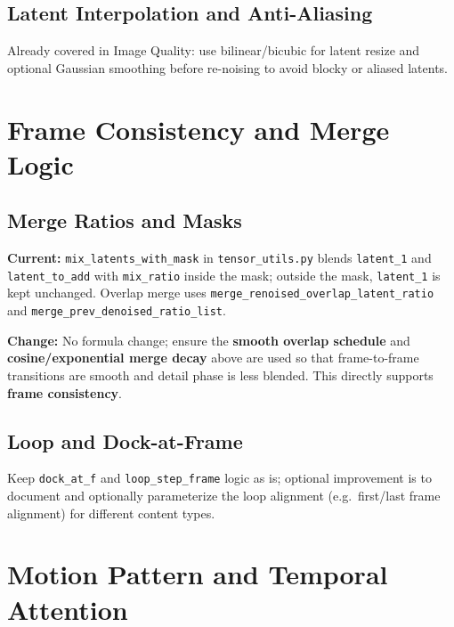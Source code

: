 \documentclass[11pt,a4paper]{article}
\newcommand{\file}[1]{\texttt{#1}}
\newcommand{\fn}[1]{\texttt{#1}}
\begin{document}
\subsection{Latent Interpolation and Anti-Aliasing}

Already covered in Image Quality: use bilinear/bicubic for latent resize and optional Gaussian smoothing before re-noising to avoid blocky or aliased latents.

\section{Frame Consistency and Merge Logic}

\subsection{Merge Ratios and Masks}

\textbf{Current:} \fn{mix\_latents\_with\_mask} in \file{tensor\_utils.py} blends \fn{latent\_1} and \fn{latent\_to\_add} with \fn{mix\_ratio} inside the mask; outside the mask, \fn{latent\_1} is kept unchanged. Overlap merge uses \fn{merge\_renoised\_overlap\_latent\_ratio} and \fn{merge\_prev\_denoised\_ratio\_list}.

\textbf{Change:} No formula change; ensure the \textbf{smooth overlap schedule} and \textbf{cosine/exponential merge decay} above are used so that frame-to-frame transitions are smooth and detail phase is less blended. This directly supports \textbf{frame consistency}.

\subsection{Loop and Dock-at-Frame}

Keep \fn{dock\_at\_f} and \fn{loop\_step\_frame} logic as is; optional improvement is to document and optionally parameterize the loop alignment (e.g.\ first/last frame alignment) for different content types.

\section{Motion Pattern and Temporal Attention}
\end{document}
